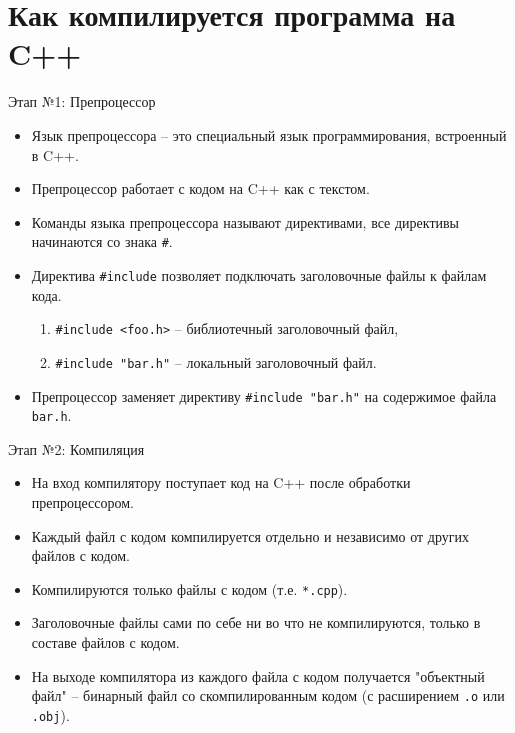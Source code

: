 \documentclass[9pt]{beamer}
\begin{document}
\section{Как компилируется программа на C++}
\begin{frame}[fragile]{Этап №1: Препроцессор}
    \begin{itemize}
        \item Язык препроцессора -- это специальный язык программирования, встроенный в C++.
        \item Препроцессор работает с кодом на C++ как с текстом.
        \item Команды языка препроцессора называют директивами, все директивы начинаются со знака \texttt{#}.
        \item Директива \texttt{#include} позволяет подключать заголовочные файлы к файлам кода.
        \begin{enumerate}
            \item \texttt{#include <foo.h>} -- библиотечный заголовочный файл,
            \item \texttt{#include "bar.h"} -- локальный заголовочный файл.
        \end{enumerate}
        \item Препроцессор заменяет директиву \texttt{#include "bar.h"} на содержимое файла \texttt{bar.h}.
    \end{itemize}
\end{frame}

\begin{frame}{Этап №2: Компиляция}
    \begin{itemize}
        \item На вход компилятору поступает код на C++ после обработки препроцессором.
        \item Каждый файл с кодом компилируется отдельно и независимо от других файлов с кодом.
        \item Компилируются только файлы с кодом (т.е. \texttt{*.cpp}).
        \item Заголовочные файлы сами по себе ни во что не компилируются, только в составе файлов с кодом.
        \item На выходе компилятора из каждого файла с кодом получается "объектный файл" -- бинарный файл со скомпилированным кодом (с расширением \texttt{.o} или \texttt{.obj}).
    \end{itemize}
\end{frame}
\end{document}
